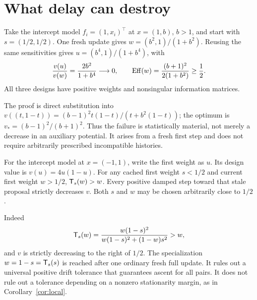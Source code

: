 \documentclass[11pt]{article}
\begin{document}
\section{What delay can destroy}
\begin{proposition}\label{prop:bad}
Take the intercept model $f_i=(1,x_i)^\top$ at $x=(1,b)$, $b>1$,
and start with $s=(1/2,1/2)$.
One fresh update gives $w=(b^2,1)/(1+b^2)$.
Reusing the same sensitivities gives $u=(b^4,1)/(1+b^4)$, with
\[
 \frac{v(u)}{v(w)}=\frac{2b^2}{1+b^4}\longrightarrow0,
 \qquad \operatorname{Eff}(w)=\frac{(b+1)^2}{2(1+b^2)}\ge\frac12.
\]
All three designs have positive weights and nonsingular information matrices.
\end{proposition}
The proof is direct substitution into
$v((t,1-t))=(b-1)^2t(1-t)/(t+b^2(1-t))$;
the optimum is $v_*=(b-1)^2/(b+1)^2$.
Thus the failure is statistically material, not merely a decrease in an auxiliary potential.
It arises from a fresh first step and does not require arbitrarily prescribed incompatible histories.

\begin{proposition}\label{prop:cross}
For the intercept model at $x=(-1,1)$, write the first weight as $u$.
Its design value is $v(u)=4u(1-u)$.
For any cached first weight $s<1/2$ and current first weight $w>1/2$,
$\mathsf T_s(w)>w$.
Every positive damped step toward that stale proposal strictly decreases $v$.
Both $s$ and $w$ may be chosen arbitrarily close to $1/2$.
\end{proposition}
Indeed
\[
 \mathsf T_s(w)=\frac{w(1-s)^2}{w(1-s)^2+(1-w)s^2}>w,
\]
and $v$ is strictly decreasing to the right of $1/2$.
The specialization $w=1-s=\mathsf T_s(s)$ is reached after one ordinary fresh full update.
It rules out a universal positive drift tolerance that guarantees ascent for all pairs.
It does not rule out a tolerance depending on a nonzero stationarity margin, as in Corollary~\ref{cor:local}.
\end{document}

